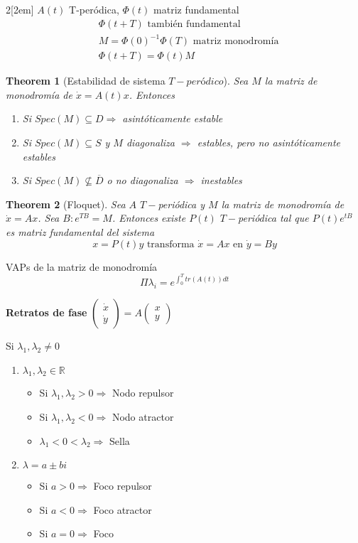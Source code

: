 \documentclass{myclass}
\newtheorem*{theorem}{Theorem}
\begin{document}
\begin{multicols}{2}[\columnsep2em]
$A(t)$ T-peródica, $\Phi (t)$ matriz fundamental
\begin{align*}
  & \Phi (t + T) \text{ también fundamental} \\
  & M = \Phi (0)^{-1}\Phi (T) \text{ matriz monodromía}\\
  & \Phi (t+T)=\Phi (t)M
\end{align*}

\begin{theorem}[Estabilidad de sistema $T-peródico$] Sea $M$ la matriz de monodromía de  $\dot{x} = A(t)x$. Entonces
  \begin{enumerate}[topsep=-6pt, itemsep=0pt]
    \item Si $Spec(M)\subseteq D \Rightarrow $ asintóticamente estable
	\item Si  $Spec(M)\subseteq S$ y $M$ diagonaliza  $\Rightarrow$ estables, pero no asintóticamente estables
	\item Si $Spec(M)\not\subseteq \overline{D} $ o no diagonaliza $\Rightarrow$ inestables
  \end{enumerate}
\end{theorem}

\begin{theorem}[Floquet]
Sea $A$  $T-$periódica y  $M$ la matriz de monodromía de  $\dot{x}=Ax$. Sea $B : e^{TB}=M$. Entonces existe $P(t)$  $T-$periódica tal que  $P(t)e^{tB}$ es matriz fundamental del sistema
\[
x = P(t)y \text{ transforma } \dot{x}=Ax \text{ en } \dot{y} = By
\] 
\end{theorem}

VAPs de la matriz de monodromía
\[
\Pi \lambda_i = e^{\int_0^T tr(A(t))dt}
\] 

\textbf{Retratos de fase} $\displaystyle \begin{pmatrix} \dot{x}\\\dot{y} \end{pmatrix} = A \begin{pmatrix} x\\y \end{pmatrix}  $

Si $\lambda_1, \lambda_2 \neq 0$
\begin{enumerate}[topsep=-6pt, itemsep=0pt]
  \item $\lambda_1, \lambda_2 \in \mathbb{R}$
	\begin{itemize}[topsep=-6pt, itemsep=0pt]
	  \item Si $\lambda_1, \lambda_2>0 \Rightarrow $ Nodo repulsor
	  \item Si $\lambda_1, \lambda_2<0 \Rightarrow $ Nodo atractor
	  \item $\lambda_1<0<\lambda_2 \Rightarrow $ Sella
	\end{itemize}
  \item $\lambda = a\pm bi$
	\begin{itemize}[topsep=-6pt, itemsep=0pt]
	  \item Si $a>0 \Rightarrow$ Foco repulsor 
	  \item Si $a<0 \Rightarrow$ Foco atractor
	  \item Si $a=0 \Rightarrow$ Foco
	\end{itemize}
\end{enumerate}


\end{multicols}
\end{document}
